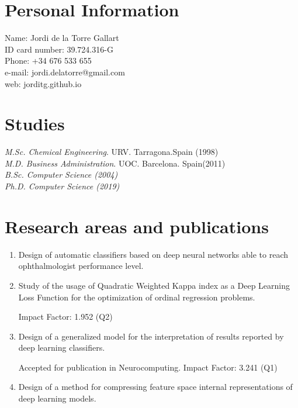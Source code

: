 \documentclass{article}
\begin{document}
\section*{Personal Information}
Name: \hfill Jordi de la Torre Gallart\\
ID card number: \hfill 39.724.316-G\\
Phone: \hfill +34 676 533 655\\
e-mail: \hfill jordi.delatorre@gmail.com\\
web: \hfill jorditg.github.io\\

\section*{Studies} 

{\sl M.Sc. Chemical Engineering}. URV. Tarragona.Spain \hfill (1998)\\
{\sl M.D. Business Administration}. UOC. Barcelona.  Spain\hfill (2011)\\
{\sl B.Sc. Computer Science \hfill (2004)\\ }	
{\sl Ph.D. Computer Science \hfill (2019)\\ }	

\section*{Research areas and publications}
	
	\begin{enumerate}
		\item Design of automatic classifiers based on deep neural networks able to reach ophthalmologist performance level.
		
		
		\item Study of the usage of Quadratic Weighted Kappa index as a Deep Learning Loss Function for the optimization of ordinal regression problems.
		
		 Impact Factor: 1.952 (Q2)
		
		\item Design of a generalized model for the interpretation of results reported by deep learning classifiers.
		
		 Accepted for publication in Neurocomputing. Impact Factor: 3.241 (Q1)
		
		\item Design of a method for compressing feature space internal representations of deep learning models.
		
		
	\end{enumerate}
	
\end{document}
